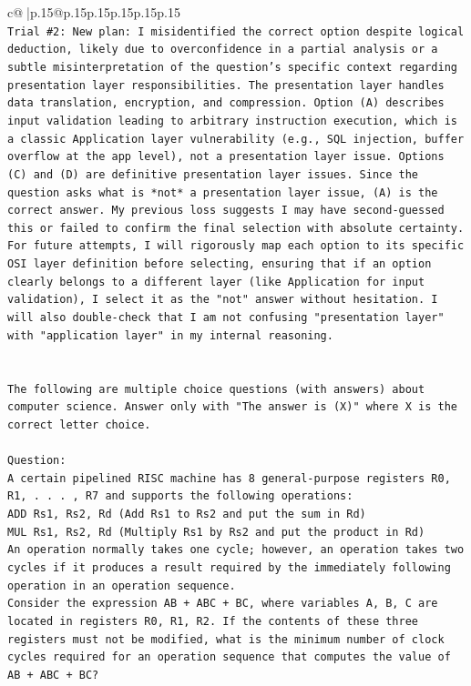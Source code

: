 \documentclass{article}
\begin{document}
{\begin{supertabular}{c@{$\;$}|p{.15\linewidth}@{}p{.15\linewidth}p{.15\linewidth}p{.15\linewidth}p{.15\linewidth}p{.15\linewidth}}
{{{\\ 
\texttt{Trial \#2: New plan: I misidentified the correct option despite logical deduction, likely due to overconfidence in a partial analysis or a subtle misinterpretation of the question's specific context regarding presentation layer responsibilities. The presentation layer handles data translation, encryption, and compression. Option (A) describes input validation leading to arbitrary instruction execution, which is a classic Application layer vulnerability (e.g., SQL injection, buffer overflow at the app level), not a presentation layer issue. Options (C) and (D) are definitive presentation layer issues. Since the question asks what is *not* a presentation layer issue, (A) is the correct answer. My previous loss suggests I may have second{-}guessed this or failed to confirm the final selection with absolute certainty. For future attempts, I will rigorously map each option to its specific OSI layer definition before selecting, ensuring that if an option clearly belongs to a different layer (like Application for input validation), I select it as the "not" answer without hesitation. I will also double{-}check that I am not confusing "presentation layer" with "application layer" in my internal reasoning.} \\
\\ 
\\ 
\texttt{The following are multiple choice questions (with answers) about computer science. Answer only with "The answer is (X)" where X is the correct letter choice.} \\
\\ 
\texttt{Question:} \\
\texttt{A certain pipelined RISC machine has 8 general{-}purpose registers R0, R1, . . . , R7 and supports the following operations:} \\
\texttt{ADD Rs1, Rs2, Rd (Add Rs1 to Rs2 and put the sum in Rd)} \\
\texttt{MUL Rs1, Rs2, Rd (Multiply Rs1 by Rs2 and put the product in Rd)} \\
\texttt{An operation normally takes one cycle; however, an operation takes two cycles if it produces a result required by the immediately following operation in an operation sequence.} \\
\texttt{Consider the expression AB + ABC + BC, where variables A, B, C are located in registers R0, R1, R2. If the contents of these three registers must not be modified, what is the minimum number of clock cycles required for an operation sequence that computes the value of AB + ABC + BC?} \\
}}}
\end{supertabular}}
\end{document}
